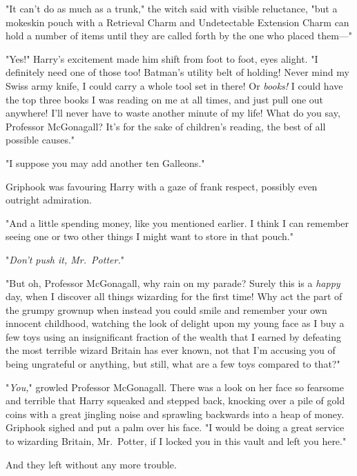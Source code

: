 "It can't do as much as a trunk," the witch said with visible reluctance,
"but{\el} a mokeskin pouch with a Retrieval Charm and Undetectable Extension
Charm can hold a number of items until they are called forth by the one who
placed them—"

"Yes!" Harry's excitement made him shift from foot to foot,
eyes alight. "I definitely need one of those too! 
Batman's utility belt of holding! Never mind my Swiss
army knife, I could carry a whole tool set in there! Or \emph{books!} I could
have the top three books I was reading on me at all times, and just pull one
out anywhere! I'll never have to waste another minute of my life! What do you
say, Professor McGonagall? It's for the sake of children's reading, the best of
all possible causes."

"{\el}I suppose you may add another ten Galleons."

Griphook was favouring Harry with a gaze of frank respect, possibly even
outright admiration.

"And a little spending money, like you mentioned earlier. I think I can
remember seeing one or two other things I might want to store in that pouch."

"\emph{Don't push it, Mr.~Potter.}"

"But oh, Professor McGonagall, why rain on my parade? Surely this is a
\emph{happy} day, when I discover all things wizarding for the first time! Why
act the part of the grumpy grownup when instead you could smile and remember
your own innocent childhood, watching the look of delight upon my young face as
I buy a few toys using an insignificant fraction of the wealth that I earned by
defeating the most terrible wizard Britain has ever known, not that I'm
accusing you of being ungrateful or anything, but still, what are a few toys
compared to that?"

"\emph{You,}" growled Professor McGonagall. There was a look on her face so
fearsome and terrible that Harry squeaked and stepped back, knocking over a
pile of gold coins with a great jingling noise and sprawling backwards into a
heap of money. Griphook sighed and put a palm over his face. "I would be doing
a great service to wizarding Britain, Mr.~Potter, if I locked you in this vault
and left you here."

And they left without any more trouble.
